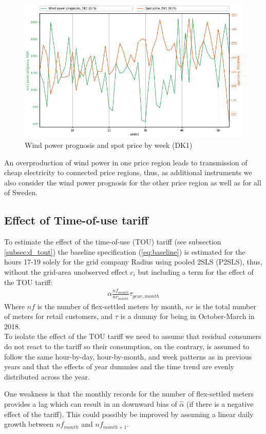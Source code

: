 \vspace{-1em}
\begin{figure}[H]
  \centering
  \caption{Wind power prognosis and spot price by week (DK1)}
  \label{fig:wp_price_dk1_week}
    \includegraphics[width=1 \textwidth]{03_figures/wp_DK1_weeks}
\end{figure}
\noindent
An overproduction of wind power in one price region leads to transmission of cheap electricity to connected price regions, thus, as additional instruments we also consider the wind power prognosis for the other price region as well as for all of Sweden.

\subsection{Effect of Time-of-use tariff}
\label{subsec:e_tout}
To estimate the effect of the time-of-use (TOU) tariff (see subsection \ref{subsec:d_tout}) the baseline specification (\ref{eq:baseline}) is estimated for the hours 17-19 solely for the grid company Radius using pooled 2SLS (P2SLS), thus, without the grid-area unobserved effect $c_i$ but including a term for the effect of the TOU tariff:
\begin{align}
  \alpha\frac{nf_{month}}{nr_{month}}\tau_{year,month}
  \label{eq:tout}
\end{align}
Where $nf$ is the number of flex-settled meters by month, $nr$ is the total number of meters for retail customers, and $\tau$ is a dummy for being in October-March in 2018.
\medskip\\
To isolate the effect of the TOU tariff we need to assume that residual consumers do not react to the tariff so their consumption, on the contrary, is assumed to follow the same hour-by-day, hour-by-month, and week patterns as in previous years and that the effects of year dummies and the time trend are evenly distributed across the year.
\par
One weakness is that the monthly records for the number of flex-settled meters provides a lag which can result in an downward bias of $\widehat{\alpha}$ (if there is a negative effect of the tariff). This could possibly be improved by assuming a linear daily growth between $nf_{month}$ and $nf_{month+1}$.


